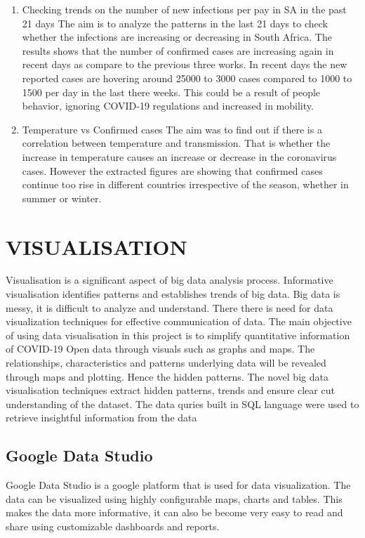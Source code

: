\documentclass[12pt]{article}
\begin{document}
\begin{enumerate}
    
    \item Checking trends on the number of new infections per pay in SA in the past 21 days
    The aim is to analyze the patterns in the last 21 days  to check whether the infections are increasing or decreasing in South Africa. The results shows that the number of confirmed cases are increasing again in recent days as compare to the previous three works. In recent days the new reported cases are hovering around 25000 to 3000 cases compared to 1000 to 1500 per day in the last there weeks. This could be a result of people behavior, ignoring COVID-19 regulations and increased in mobility. 
     
     \item Temperature vs Confirmed cases
     The aim was to find out if there is a correlation between temperature and transmission. That is whether the increase in temperature causes an increase or decrease in the coronavirus cases. However the extracted figures are showing that confirmed cases continue too rise in different countries irrespective of the season, whether in summer or winter. 
    
\end{enumerate}

\section{VISUALISATION}
Visualisation is a significant aspect of big data analysis process. Informative visualisation identifies patterns and establishes trends of big data. Big data is messy, it is difficult to analyze and understand. There there is need for data visualization techniques for effective communication of data. The main objective of using data visualisation in this project is to simplify quantitative information of COVID-19 Open data through visuals such as graphs and maps. The relationships, characteristics and patterns underlying data will be revealed through maps and plotting. Hence the  hidden patterns. The novel big data visualisation techniques extract hidden patterns, trends and ensure clear cut understanding of the dataset. The data quries built in SQL language were used to retrieve insightful information from the data


\subsection{Google Data Studio}
 Google Data Studio is a google platform that is used for data visualization. The data can be visualized using highly configurable maps, charts and tables. This makes the data more informative, it can also be become very easy to read and share using customizable dashboards and reports. 
 
\end{document}
